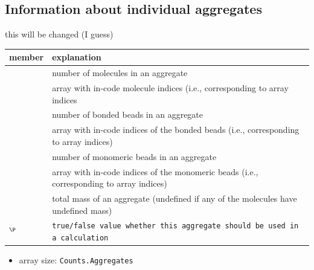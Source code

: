 \subsection[Aggregate]{Information about individual
  aggregates}\label{ssec:Aggregates}
\TODO this will be changed (I guess)
 \\
\vspace{-1.75em}
\begin{longtable}{L{0.27\textwidth}p{0.775\textwidth}}
  \toprule
  member             & explanation \\
  \midrule
   & number of molecules in an aggregate\\
   & array with in-code molecule indices (i.e.,
                          corresponding to  array indices\\
       & number of bonded beads in an aggregate\\
       & array with in-code indices of the bonded beads (i.e.,
                          corresponding to  array indices)\\
    & number of monomeric beads in an aggregate\\
    & array with in-code indices of the monomeric beads
                          (i.e., corresponding to  array
                          indices)\\
      & total mass of an aggregate (undefined if any of
                          the molecules have undefined mass)\\
  $^\P$  & \tt{true}/\tt{false} value whether this aggregate
                          should be used in a calculation\\
  \bottomrule
\end{longtable}
\begin{itemize}
  \item array size: \tt{Counts.Aggregates}
\end{itemize} %

